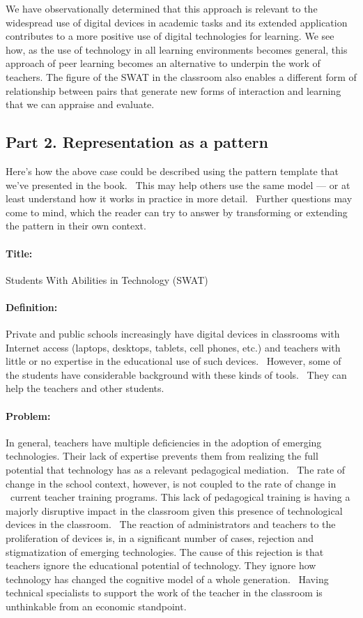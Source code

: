 We have observationally determined that this approach is relevant to the
widespread use of digital devices in academic tasks and its extended
application contributes to a more positive use of digital technologies
for learning. We see how, as the use of technology in all learning
environments becomes general, this approach of peer learning becomes an
alternative to underpin the work of teachers. The figure of the SWAT in
the classroom also enables a different form of relationship between
pairs that generate new forms of interaction and learning that we can
appraise and evaluate.

\subsection{Part 2. Representation as a pattern}

Here's how the above case could be described using the pattern template
that we've presented in the book. ~This may help others use the same
model --- or at least understand how it works in practice in more
detail. ~Further questions may come to mind, which the reader can try to
answer by transforming or extending the pattern in their own context.

\paragraph{Title:} Students With Abilities in Technology (SWAT)

\paragraph{Definition:}
Private and public schools increasingly have digital devices in
classrooms with Internet access (laptops, desktops, tablets, cell
phones, etc.) and teachers with little or no expertise in the
educational use of such devices. ~However, some of the students have
considerable background with these kinds of tools.~ They can help the
teachers and other students.

\paragraph{Problem:}
In general, teachers have multiple deficiencies in the adoption of
emerging technologies. Their lack of expertise prevents them from
realizing the full potential that technology has as a relevant
pedagogical mediation. ~The rate of change in the school context,
however, is not coupled to the rate of change in ~current teacher
training programs. This lack of pedagogical training is having a majorly
disruptive impact in the classroom given this presence of technological
devices in the classroom. ~The reaction of administrators and teachers
to the proliferation of devices is, in a significant number of cases,
rejection and stigmatization of emerging technologies. The cause of this
rejection is that teachers ignore the educational potential of
technology. They ignore how technology has changed the cognitive model
of a whole generation. ~Having technical specialists to support the work
of the teacher in the classroom is unthinkable from an economic
standpoint.

